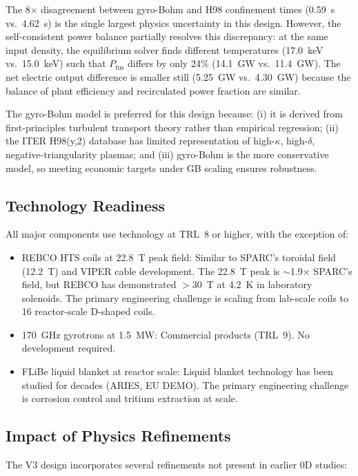 \documentclass[11pt,a4paper]{article}
\begin{document}
The 8$\times$ disagreement between gyro-Bohm and H98 confinement times (0.59~s vs.~4.62~s) is the single largest physics uncertainty in this design. However, the self-consistent power balance partially resolves this discrepancy: at the same input density, the equilibrium solver finds different temperatures (17.0~keV vs.~15.0~keV) such that $P_{\text{fus}}$ differs by only 24\% (14.1~GW vs.~11.4~GW). The net electric output difference is smaller still (5.25~GW vs.~4.30~GW) because the balance of plant efficiency and recirculated power fraction are similar.

The gyro-Bohm model is preferred for this design because: (i) it is derived from first-principles turbulent transport theory rather than empirical regression; (ii) the ITER H98(y,2) database has limited representation of high-$\kappa$, high-$\delta$, negative-triangularity plasmas; and (iii) gyro-Bohm is the more conservative model, so meeting economic targets under GB scaling ensures robustness.

\subsection{Technology Readiness}

All major components use technology at TRL~8 or higher, with the exception of:

\begin{itemize}[nosep]
    \item REBCO HTS coils at 22.8~T peak field: Similar to SPARC's toroidal field (12.2~T) and VIPER cable development. The 22.8~T peak is $\sim$1.9$\times$ SPARC's field, but REBCO has demonstrated $> 30$~T at 4.2~K in laboratory solenoids. The primary engineering challenge is scaling from lab-scale coils to 16 reactor-scale D-shaped coils.
    \item 170~GHz gyrotrons at 1.5~MW: Commercial products (TRL~9). No development required.
    \item FLiBe liquid blanket at reactor scale: Liquid blanket technology has been studied for decades (ARIES, EU DEMO). The primary engineering challenge is corrosion control and tritium extraction at scale.
\end{itemize}

\subsection{Impact of Physics Refinements}

The V3 design incorporates several refinements not present in earlier 0D studies:
\end{document}
